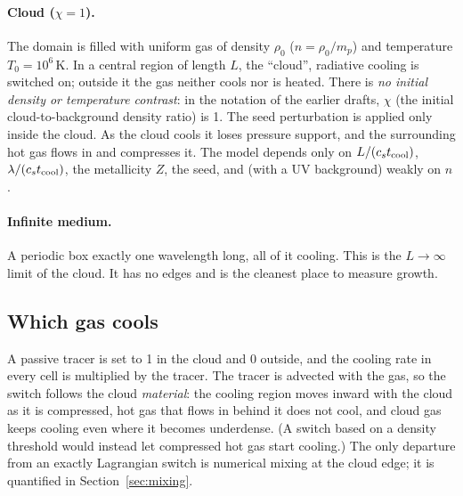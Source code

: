 \documentclass[11pt]{article}
\newcommand{\cstc}{c_s t_{\rm cool}}
\begin{document}
\paragraph{Cloud ($\chi=1$).}
The domain is filled with uniform gas of density $\rho_0$ ($n=\rho_0/m_p$) and
temperature $T_0=10^6$\,K. In a central region of length $L$, the ``cloud'',
radiative cooling is switched on; outside it the gas neither cools nor is heated.
There is \emph{no initial density or temperature contrast}: in the notation of
the earlier drafts, $\chi$ (the initial cloud-to-background density ratio) is 1.
The seed perturbation is applied only inside the cloud. As the cloud cools it
loses pressure support, and the surrounding hot gas flows in and compresses it.
The model depends only on $L/(\cstc)$, $\lambda/(\cstc)$, the metallicity $Z$,
the seed, and (with a UV background) weakly on $n$.

\paragraph{Infinite medium.}
A periodic box exactly one wavelength long, all of it cooling. This is the
$L\to\infty$ limit of the cloud. It has no edges and is the cleanest place to
measure growth.

\subsection{Which gas cools}
\label{sec:switch}
A passive tracer is set to 1 in the cloud and 0 outside, and the cooling rate in
every cell is multiplied by the tracer. The tracer is advected with the gas, so
the switch follows the cloud \emph{material}: the cooling region moves inward
with the cloud as it is compressed, hot gas that flows in behind it does not
cool, and cloud gas keeps cooling even where it becomes underdense. (A switch
based on a density threshold would instead let compressed hot gas start
cooling.) The only departure from an exactly Lagrangian switch is numerical
mixing at the cloud edge; it is quantified in Section~\ref{sec:mixing}.
\end{document}
